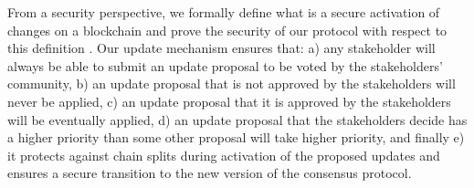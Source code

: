 
From a security perspective, we formally define what is a secure 
activation of changes on a blockchain and prove the security of our protocol 
with respect to this definition \cite{secure_activation} .  Our update mechanism
ensures that:
a) any stakeholder will always be able to submit an update proposal to be voted by the stakeholders' community, b) an update proposal that is not approved by the stakeholders
 will never be applied, c) an update proposal that it is approved by the 
 stakeholders will be eventually applied, d) an update proposal that the 
 stakeholders decide has a higher priority than some other proposal will take 
 higher priority, 
 and finally e) it protects against chain splits during activation of the 
 proposed updates and ensures a secure transition to the new version of the 
 consensus protocol.

